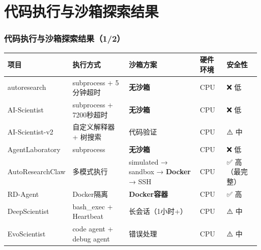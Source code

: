 \documentclass[
  aspectratio=169,
  presentation,
  titlegraphic=./images/bit_logo.pdf,
  framelogo=./images/bit_logo.pdf
]{bitbeamer}
\begin{document}
\section{代码执行与沙箱探索结果}

\begin{frame}[t]
  \frametitle{代码执行与沙箱探索结果（1/2）}

  \begin{table}
    \centering
    \scriptsize
    \begin{tabular}{p{2.5cm}p{2.5cm}p{2.5cm}p{1.5cm}p{1.5cm}}
      \toprule
      \textbf{项目} & \textbf{执行方式} & \textbf{沙箱方案} & \textbf{硬件环境} & \textbf{安全性} \\
      \midrule
      autoresearch & subprocess + 5分钟超时 & \textbf{无沙箱} & CPU & ❌ 低 \\
      \midrule
      AI-Scientist & subprocess + 7200秒超时 & \textbf{无沙箱} & CPU & ❌ 低 \\
      \midrule
      AI-Scientist-v2 & 自定义解释器 + 树搜索 & 代码验证 & CPU & ⚠️ 中 \\
      \midrule
      AgentLaboratory & subprocess & \textbf{无沙箱} & CPU & ❌ 低 \\
      \midrule
      AutoResearchClaw & 多模式执行 & simulated → sandbox → \textbf{Docker} → SSH & CPU & ✅ 高（最完整） \\
      \midrule
      RD-Agent & Docker隔离 & \textbf{Docker容器} & CPU & ✅ 高 \\
      \midrule
      DeepScientist & bash\_exec + Heartbeat & 长会话（1小时+） & CPU & ⚠️ 中 \\
      \midrule
      EvoScientist & code agent + debug agent & 错误处理 & CPU & ⚠️ 中 \\
      \bottomrule
    \end{tabular}
  \end{table}

\end{frame}
\end{document}
